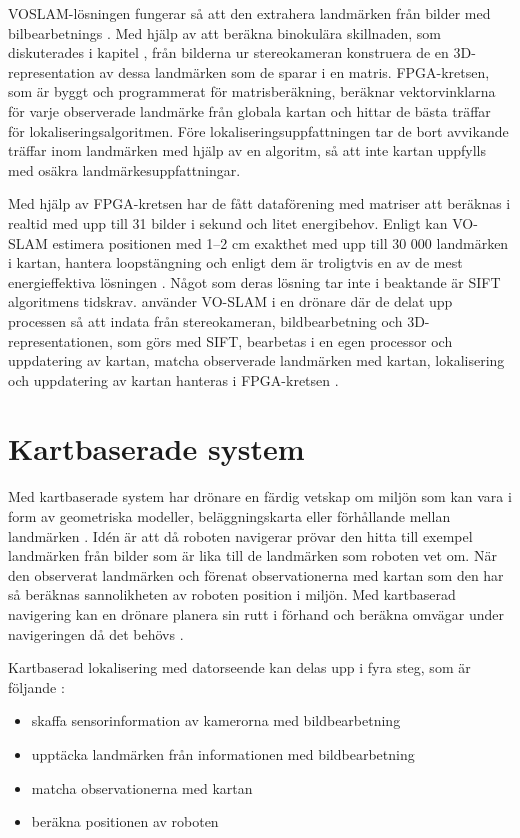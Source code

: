 VOSLAM-lösningen fungerar så att den extrahera landmärken från bilder med bilbearbetnings \citep{voslam}. Med hjälp av att beräkna binokulära skillnaden, som diskuterades i kapitel , från bilderna ur stereokameran konstruera de en 3D-representation av dessa landmärken som de sparar i en matris. FPGA-kretsen, som är byggt och programmerat för matrisberäkning, beräknar vektorvinklarna för varje observerade landmärke från globala kartan och hittar de bästa träffar för lokaliseringsalgoritmen. Före lokaliseringsuppfattningen tar de bort avvikande träffar inom landmärken med hjälp av en algoritm, så att inte kartan uppfylls med osäkra landmärkesuppfattningar. 

Med hjälp av FPGA-kretsen har de fått dataförening med matriser att beräknas i realtid med upp till 31 bilder i sekund och litet energibehov. Enligt \cite{voslam} kan VO-SLAM estimera positionen med 1–2 cm exakthet med upp till 30 000 landmärken i kartan, hantera loopstängning och enligt dem är troligtvis en av de mest energieffektiva lösningen \citep{voslam}. Något som deras lösning tar inte i beaktande är SIFT algoritmens tidskrav. \cite{voslamlatif} använder VO-SLAM i en drönare där de delat upp processen så att indata från stereokameran, bildbearbetning och 3D-representationen, som görs med SIFT, bearbetas i en egen processor och uppdatering av kartan, matcha observerade landmärken med kartan, lokalisering och uppdatering av kartan hanteras i FPGA-kretsen \citep{voslamlatif}. 

\section{Kartbaserade system}

Med kartbaserade system har drönare en färdig vetskap om miljön som kan vara i form av geometriska modeller, beläggningskarta eller förhållande mellan landmärken \citep{982903}. Idén är att då roboten navigerar prövar den hitta till exempel landmärken från bilder som är lika till de landmärken som roboten vet om. När den observerat landmärken och förenat observationerna med kartan som den har så beräknas sannolikheten av roboten position i miljön. Med kartbaserad navigering kan en drönare planera sin rutt i förhand och beräkna omvägar under navigeringen då det behövs \citep{geospatial}. 

Kartbaserad lokalisering med datorseende kan delas upp i fyra steg, som är följande \citep{982903}:

\begin{itemize}
    \item skaffa sensorinformation av kamerorna med bildbearbetning
    \item upptäcka landmärken från informationen med bildbearbetning
    \item matcha observationerna med kartan
    \item beräkna positionen av roboten
\end{itemize}

